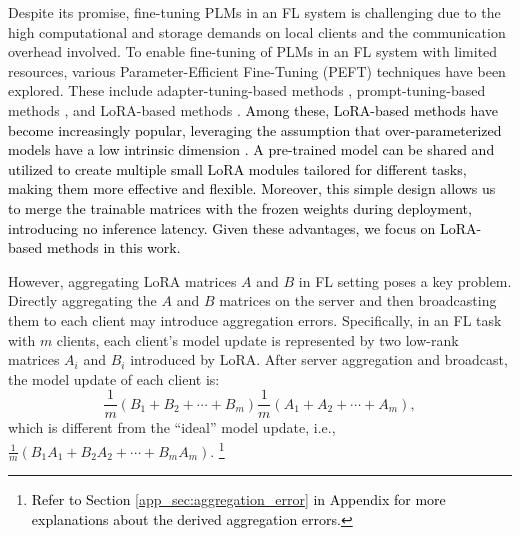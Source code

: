 \documentclass{article} %
\newcommand{\pengxin}[1]{\textcolor{black}{#1}}
\begin{document}
Despite its promise, fine-tuning PLMs in an FL system is challenging due to the high computational and storage demands on local clients and the communication overhead involved. 
To enable fine-tuning of PLMs in an FL system with limited resources, various Parameter-Efficient Fine-Tuning (PEFT) techniques have been explored. %
These include adapter-tuning-based methods \citep{houlsby2019parameter,zhang2024enhancing}, prompt-tuning-based methods \citep{li2021prefix,guo2023promptfl,che2023federated,guo2023pfedprompt,qiu2024federated,li2024global,deng2024unlocking,sun2024fedbpt,cui2024harmonizing,cao2024sfprompt}, and LoRA-based methods \citep{hulora,yi2023fedlora,liu2023differentially,yang2024dual,qi2024fdlora,cho2023heterogeneous,byun2024towards,chen2024rbla,sunimproving,lin2024splitlora,wu2024fedbiot,wang2024flora}. 
\pengxin{Among these, LoRA-based methods have become increasingly popular, leveraging the assumption that over-parameterized models have a low intrinsic dimension \citep{li2018measuring,aghajanyan2020intrinsic}. A pre-trained model can be shared and utilized to create multiple small LoRA modules tailored for different tasks, making them more effective and flexible. Moreover, this simple design allows us to merge the trainable matrices with the frozen weights during deployment, introducing no inference latency. Given these advantages, we focus on LoRA-based methods in this work.}

However, aggregating LoRA matrices $A$ and $B$ in FL setting poses a key problem. Directly aggregating the $A$ and $B$ matrices on the server and then broadcasting them to each client may introduce aggregation errors. 
Specifically, in an FL task with \(m\) clients, each client’s model update is represented by two low-rank matrices \(A_i\) and \(B_i\) introduced by LoRA.
After server aggregation and broadcast, the model update of each client is:
\begin{equation} \label{eq:lora}
\frac{1}{m}(B_1 + B_2 + \cdots + B_m)\frac{1}{m}(A_1 + A_2 + \cdots + A_m),
\end{equation}
which is different from the ``ideal'' model update, i.e., $\frac{1}{m}(B_1A_1 + B_2A_2 + \cdots + B_mA_m)$. \footnote{\pengxin{Refer to Section \ref{app_sec:aggregation_error} in Appendix for more explanations about the derived aggregation errors.}}
\end{document}
